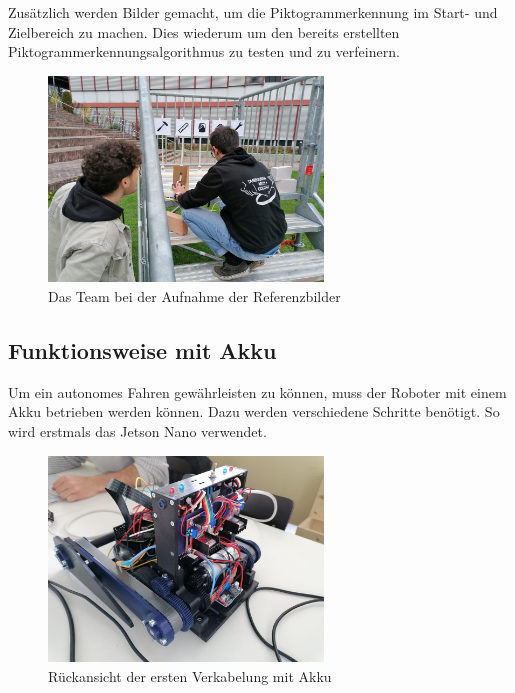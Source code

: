   Zusätzlich werden Bilder gemacht, um die Piktogrammerkennung im Start- und Zielbereich zu machen. Dies wiederum um den bereits erstellten Piktogrammerkennungsalgorithmus zu testen und zu verfeinern.
  
  
  \begin{figure}[H]
  \includegraphics[width=0.65\textwidth]{img/Sprint3/Sprint3_Bildersammlung2.jpeg}
  \centering
  \caption{Das Team bei der Aufnahme der Referenzbilder}
  \label{fig:Aufnahmeprozess der Referenzbilder}
  \end{figure}
  
  
\subsection{Funktionsweise mit Akku}\label{sec:Funktionsweisemit Akku}

Um ein autonomes Fahren gewährleisten zu können, muss der Roboter mit einem Akku betrieben werden können. Dazu werden verschiedene Schritte benötigt. So wird erstmals das Jetson Nano verwendet.

 \begin{figure}[H]
  \includegraphics[width=0.65\textwidth]{img/Sprint3/Sprint3_Verkabelung1.jpg}
  \centering
  \caption{Rückansicht der ersten Verkabelung mit Akku}
  \label{fig:Rückansicht der ersten Verkabelung}
  \end{figure}
  
